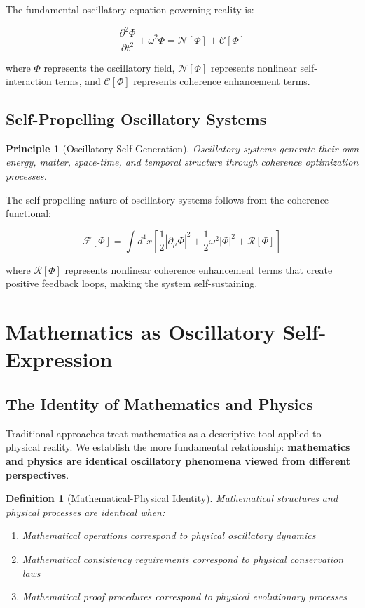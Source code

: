 \documentclass[11pt]{article}
\newtheorem{definition}[theorem]{Definition}
\newtheorem{principle}[theorem]{Principle}
\theoremstyle{remark}
\begin{document}
The fundamental oscillatory equation governing reality is:

$$\frac{\partial^2 \Phi}{\partial t^2} + \omega^2 \Phi = \mathcal{N}[\Phi] + \mathcal{C}[\Phi]$$

where $\Phi$ represents the oscillatory field, $\mathcal{N}[\Phi]$ represents nonlinear self-interaction terms, and $\mathcal{C}[\Phi]$ represents coherence enhancement terms.

\subsection{Self-Propelling Oscillatory Systems}

\begin{principle}[Oscillatory Self-Generation]
Oscillatory systems generate their own energy, matter, space-time, and temporal structure through coherence optimization processes.
\end{principle}

The self-propelling nature of oscillatory systems follows from the coherence functional:

$$\mathcal{F}[\Phi] = \int d^4x \left[\frac{1}{2}|\partial_\mu \Phi|^2 + \frac{1}{2}\omega^2|\Phi|^2 + \mathcal{R}[\Phi]\right]$$

where $\mathcal{R}[\Phi]$ represents nonlinear coherence enhancement terms that create positive feedback loops, making the system self-sustaining.

\section{Mathematics as Oscillatory Self-Expression}

\subsection{The Identity of Mathematics and Physics}

Traditional approaches treat mathematics as a descriptive tool applied to physical reality. We establish the more fundamental relationship: \textbf{mathematics and physics are identical oscillatory phenomena viewed from different perspectives}.

\begin{definition}[Mathematical-Physical Identity]
Mathematical structures and physical processes are identical when:
\begin{enumerate}
\item Mathematical operations correspond to physical oscillatory dynamics
\item Mathematical consistency requirements correspond to physical conservation laws
\item Mathematical proof procedures correspond to physical evolutionary processes
\end{enumerate}
\end{definition}
\end{document}
